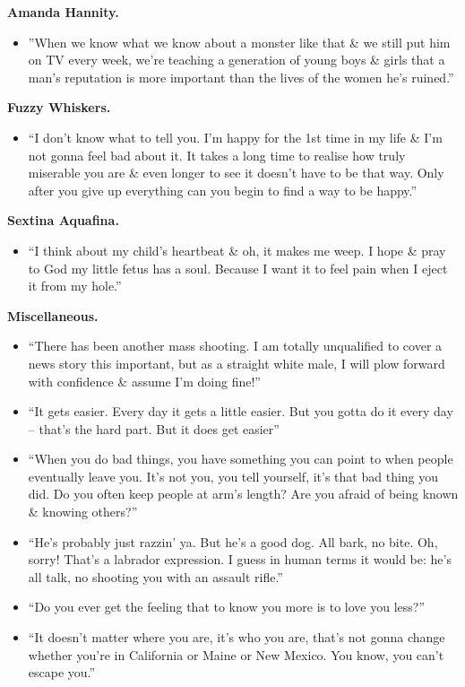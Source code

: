 \documentclass{article}
\begin{document}
\begin{enumerate}
    {\bf Amanda Hannity.}
    \begin{itemize}
    	\item ''When we know what we know about a monster like that \& we still put him on TV every week, we're teaching a generation of young boys \& girls that a man's reputation is more important than the lives of the women he's ruined.''
    \end{itemize}
    {\bf Fuzzy Whiskers.}
    \begin{itemize}
    	\item ``I don't know what to tell you. I'm happy for the 1st time in my life \& I'm not gonna feel bad about it. It takes a long time to realise how truly miserable you are \& even longer to see it doesn't have to be that way. Only after you give up everything can you begin to find a way to be happy.''
    \end{itemize}
    {\bf Sextina Aquafina.}
    \begin{itemize}
    	\item ``I think about my child's heartbeat \& oh, it makes me weep. I hope \& pray to God my little fetus has a soul. Because I want it to feel pain when I eject it from my hole.''
    \end{itemize}
    {\bf Miscellaneous.}
    \begin{itemize}
    	\item ``There has been another mass shooting. I am totally unqualified to cover a news story this important, but as a straight white male, I will plow forward with confidence \& assume I'm doing fine!''
    	\item ``It gets easier. Every day it gets a little easier. But you gotta do it every day -- that's the hard part. But it does get easier''
    	\item ``When you do bad things, you have something you can point to when people eventually leave you. It's not you, you tell yourself, it's that bad thing you did. Do you often keep people at arm's length? Are you afraid of being known \& knowing others?''
    	\item ``He's probably just razzin' ya. But he's a good dog. All bark, no bite. Oh, sorry! That's a labrador expression. I guess in human terms it would be: he's all talk, no shooting you with an assault rifle.''
    	\item ``Do you ever get the feeling that to know you more is to love you less?''
    	\item ``It doesn't matter where you are, it's who you are, that's not gonna change whether you're in California or Maine or New Mexico. You know, you can't escape you.''

\end{itemize}
\end{enumerate}
\end{document}
